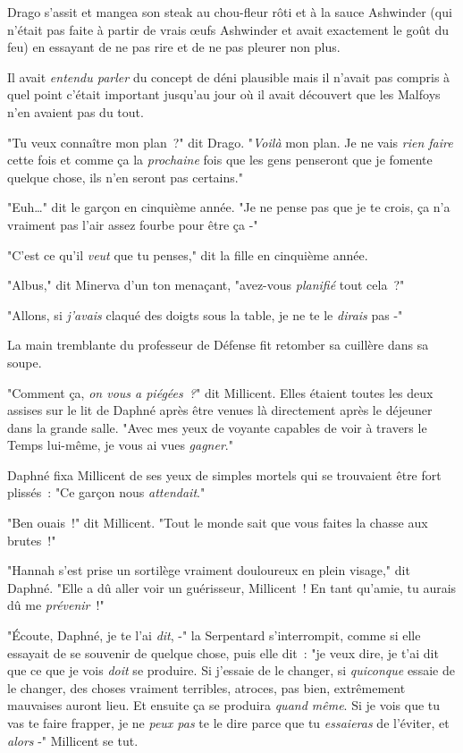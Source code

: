 \later

Drago s'assit et mangea son steak au chou-fleur rôti et à la sauce Ashwinder (qui n'était pas faite à partir de vrais œufs Ashwinder et avait exactement le goût du feu) en essayant de ne pas rire et de ne pas pleurer non plus.

Il avait \emph{entendu parler} du concept de déni plausible mais il n'avait pas compris à quel point c'était important jusqu'au jour où il avait découvert que les Malfoys n'en avaient pas du tout.

"Tu veux connaître mon plan~?" dit Drago. "\emph{Voilà} mon plan. Je ne vais \emph{rien faire} cette fois et comme ça la \emph{prochaine} fois que les gens penseront que je fomente quelque chose, ils n'en seront pas certains."

"Euh…" dit le garçon en cinquième année. "Je ne pense pas que je te crois, ça n'a vraiment pas l'air assez fourbe pour être ça -"

"C'est ce qu'il \emph{veut} que tu penses," dit la fille en cinquième année.

\later

"Albus," dit Minerva d'un ton menaçant, "avez-vous \emph{planifié} tout cela~?"

\later

"Allons, si \emph{j'avais} claqué des doigts sous la table, je ne te le \emph{dirais} pas -"

\later

La main tremblante du professeur de Défense fit retomber sa cuillère dans sa soupe.

\later

"Comment ça, \emph{on vous a piégées~?}" dit Millicent. Elles étaient toutes les deux assises sur le lit de Daphné après être venues là directement après le déjeuner dans la grande salle. "Avec mes yeux de voyante capables de voir à travers le Temps lui-même, je vous ai vues \emph{gagner}."

Daphné fixa Millicent de ses yeux de simples mortels qui se trouvaient être fort plissés~: "Ce garçon nous \emph{attendait}."

"Ben ouais~!" dit Millicent. "Tout le monde sait que vous faites la chasse aux brutes~!"

"Hannah s'est prise un sortilège vraiment douloureux en plein visage," dit Daphné. "Elle a dû aller voir un guérisseur, Millicent~! En tant qu'amie, tu aurais dû me \emph{prévenir}~!"

"Écoute, Daphné, je te l'ai \emph{dit}, -" la Serpentard s'interrompit, comme si elle essayait de se souvenir de quelque chose, puis elle dit~: "je veux dire, je t'ai dit que ce que je vois \emph{doit} se produire. Si j'essaie de le changer, si \emph{quiconque} essaie de le changer, des choses vraiment terribles, atroces, pas bien, extrêmement mauvaises auront lieu. Et ensuite ça se produira \emph{quand même}. Si je vois que tu vas te faire frapper, je ne \emph{peux pas} te le dire parce que tu \emph{essaieras} de l'éviter, et \emph{alors} -" Millicent se tut.

